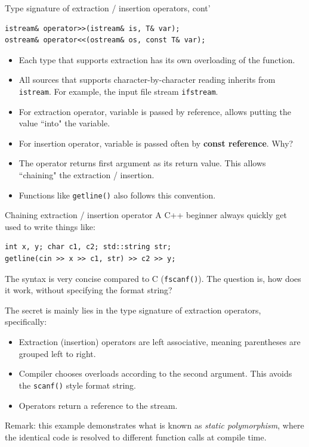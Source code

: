 \begin{frame}[fragile]{Type signature of extraction / insertion operators, cont'}

\begin{verbatim}
istream& operator>>(istream& is, T& var); 
ostream& operator<<(ostream& os, const T& var);
\end{verbatim}

\begin{itemize}
\item Each type that supports extraction has its own overloading of the function. 
\item All sources that supports character-by-character reading inherits from \texttt{istream}. For example, the input file stream \texttt{ifstream}.
\item For extraction operator, variable is passed by reference, allows putting the value ``into" the variable. 
\item For insertion operator, variable is passed often by \textbf{const reference}. Why?
\item The operator returns first argument as its return value. This allows ``chaining" the extraction / insertion. 
\item Functions like \texttt{getline()} also follows this convention. 
\end{itemize}
\end{frame}

\begin{frame}[fragile]{Chaining extraction / insertion operator}
A C++ beginner always quickly get used to write things like:
\begin{verbatim}
int x, y; char c1, c2; std::string str; 
getline(cin >> x >> c1, str) >> c2 >> y;
\end{verbatim}
The syntax is very concise compared to C (\texttt{fscanf()}). The question is, how does it work, without specifying the format string?

The secret is mainly lies in the type signature of extraction operators, specifically:
\begin{itemize}
	\item Extraction (insertion) operators are left associative, meaning parentheses are grouped left to right.
	\item Compiler chooses overloads according to the second argument. This avoids the \texttt{scanf()} style format string. 
	\item Operators return a reference to the stream. 
\end{itemize}
Remark: this example demonstrates what is known as \textit{static polymorphism}, where the identical code is resolved to different function calls at compile time.
\end{frame}

